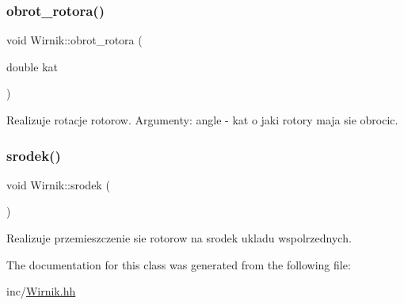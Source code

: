 \subsubsection{\texorpdfstring{obrot\_rotora()}{obrot\_rotora()}}
{\footnotesize\ttfamily void Wirnik\+::obrot\+\_\+rotora (\begin{DoxyParamCaption}\item[{double}]{kat }\end{DoxyParamCaption})\hspace{0.3cm}{\ttfamily [inline]}}

Realizuje rotacje rotorow. Argumenty\+: angle -\/ kat o jaki rotory maja sie obrocic. \mbox{\label{class_wirnik_a1237f4a0ac3638eed06b6f642814b217}} 
\subsubsection{\texorpdfstring{srodek()}{srodek()}}
{\footnotesize\ttfamily void Wirnik\+::srodek (\begin{DoxyParamCaption}{ }\end{DoxyParamCaption})\hspace{0.3cm}{\ttfamily [inline]}}

Realizuje przemieszczenie sie rotorow na srodek ukladu wspolrzednych. 

The documentation for this class was generated from the following file\+:\begin{DoxyCompactItemize}
\item 
inc/\mbox{\hyperlink{_wirnik_8hh}{Wirnik.\+hh}}\end{DoxyCompactItemize}

